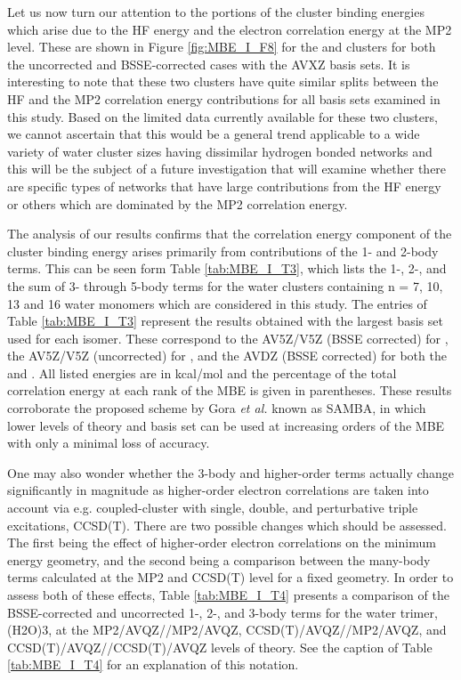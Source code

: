 \documentclass[11pt, proquest]{uwthesis}[2020/02/24]
\let\ce\ch
\begin{document}
\par Let us now turn our attention to the portions of the cluster binding energies which arise due to the HF energy and the electron correlation energy at the MP2 level. These are shown in Figure \ref{fig:MBE_I_F8} for the \ce{(H2O)7} and \ce{(H2O)_{10}} clusters for both the uncorrected and BSSE-corrected cases with the AVXZ basis sets. It is interesting to note that these two clusters have quite similar splits between the HF and the MP2 correlation energy contributions for all basis sets examined in this study. Based on the limited data currently available for these two clusters, we cannot ascertain that this would be a general trend applicable to a wide variety of water cluster sizes having dissimilar hydrogen bonded networks and this will be the subject of a future investigation that will examine whether there are specific types of networks that have large contributions from the HF energy or others which are dominated by the MP2 correlation energy.

\par The analysis of our results confirms that the correlation energy component of the cluster binding energy arises primarily from contributions of the 1- and 2-body terms. This can be seen form Table \ref{tab:MBE_I_T3}, which lists the 1-, 2-, and the sum of 3- through 5-body terms for the water clusters containing n = 7, 10, 13 and 16 water monomers which are considered in this study. The entries of Table \ref{tab:MBE_I_T3} represent the results obtained with the largest basis set used for each isomer. These correspond to the AV5Z/V5Z (BSSE corrected) for \ce{(H2O)7}, the AV5Z/V5Z (uncorrected) for \ce{(H2O)_{10}}, and the AVDZ (BSSE corrected) for both the \ce{(H2O)_{13}} and \ce{(H2O)_{16}}. All listed energies are in kcal/mol and the percentage of the total correlation energy at each rank of the MBE is given in parentheses. These results corroborate the proposed scheme by Gora \textit{et al.} known as SAMBA,\autocite{gora_interaction_2011} in which lower levels of theory and basis set can be used at increasing orders of the MBE with only a minimal loss of accuracy.

\par One may also wonder whether the 3-body and higher-order terms actually change significantly in magnitude as higher-order electron correlations are taken into account via e.g. coupled-cluster with single, double, and perturbative triple excitations, CCSD(T). There are two possible changes which should be assessed. The first being the effect of higher-order electron correlations on the minimum energy geometry, and the second being a comparison between the many-body terms calculated at the MP2 and CCSD(T) level for a fixed geometry. In order to assess both of these effects, Table \ref{tab:MBE_I_T4} presents a comparison of the BSSE-corrected and uncorrected 1-, 2-, and 3-body terms for the water trimer, (H2O)3, at the MP2/AVQZ//MP2/AVQZ, CCSD(T)/AVQZ//MP2/AVQZ, and CCSD(T)/AVQZ//CCSD(T)/AVQZ levels of theory. See the caption of Table \ref{tab:MBE_I_T4} for an explanation of this notation.
\end{document}
